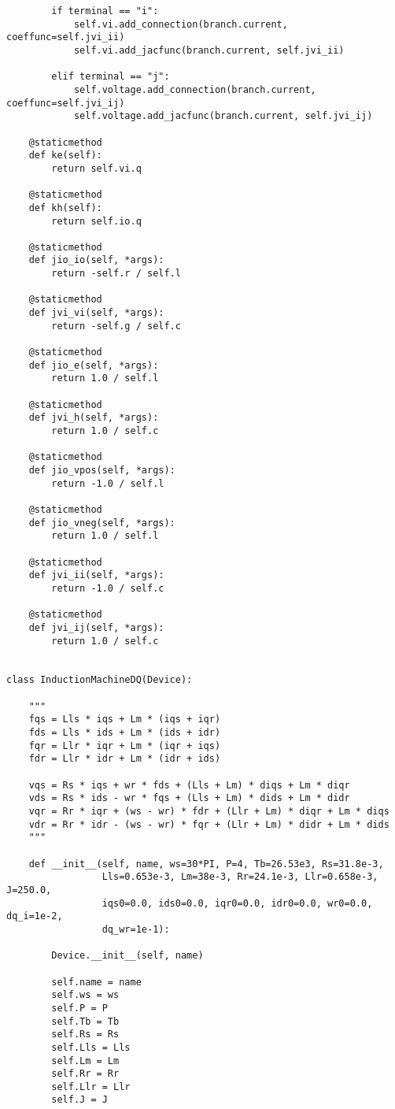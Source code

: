 \begin{lstlisting}
        if terminal == "i":
            self.vi.add_connection(branch.current, coeffunc=self.jvi_ii)
            self.vi.add_jacfunc(branch.current, self.jvi_ii)

        elif terminal == "j":
            self.voltage.add_connection(branch.current, coeffunc=self.jvi_ij)
            self.voltage.add_jacfunc(branch.current, self.jvi_ij)

    @staticmethod
    def ke(self):
        return self.vi.q

    @staticmethod
    def kh(self):
        return self.io.q

    @staticmethod
    def jio_io(self, *args):
        return -self.r / self.l

    @staticmethod
    def jvi_vi(self, *args):
        return -self.g / self.c

    @staticmethod
    def jio_e(self, *args):
        return 1.0 / self.l

    @staticmethod
    def jvi_h(self, *args):
        return 1.0 / self.c

    @staticmethod
    def jio_vpos(self, *args):
        return -1.0 / self.l

    @staticmethod
    def jio_vneg(self, *args):
        return 1.0 / self.l

    @staticmethod
    def jvi_ii(self, *args):
        return -1.0 / self.c

    @staticmethod
    def jvi_ij(self, *args):
        return 1.0 / self.c


class InductionMachineDQ(Device):

    """
    fqs = Lls * iqs + Lm * (iqs + iqr)
    fds = Lls * ids + Lm * (ids + idr)
    fqr = Llr * iqr + Lm * (iqr + iqs)
    fdr = Llr * idr + Lm * (idr + ids)

    vqs = Rs * iqs + wr * fds + (Lls + Lm) * diqs + Lm * diqr
    vds = Rs * ids - wr * fqs + (Lls + Lm) * dids + Lm * didr
    vqr = Rr * iqr + (ws - wr) * fdr + (Llr + Lm) * diqr + Lm * diqs
    vdr = Rr * idr - (ws - wr) * fqr + (Llr + Lm) * didr + Lm * dids
    """

    def __init__(self, name, ws=30*PI, P=4, Tb=26.53e3, Rs=31.8e-3,
                 Lls=0.653e-3, Lm=38e-3, Rr=24.1e-3, Llr=0.658e-3, J=250.0,
                 iqs0=0.0, ids0=0.0, iqr0=0.0, idr0=0.0, wr0=0.0, dq_i=1e-2,
                 dq_wr=1e-1):

        Device.__init__(self, name)

        self.name = name
        self.ws = ws
        self.P = P
        self.Tb = Tb
        self.Rs = Rs
        self.Lls = Lls
        self.Lm = Lm
        self.Rr = Rr
        self.Llr = Llr
        self.J = J


\end{lstlisting}
